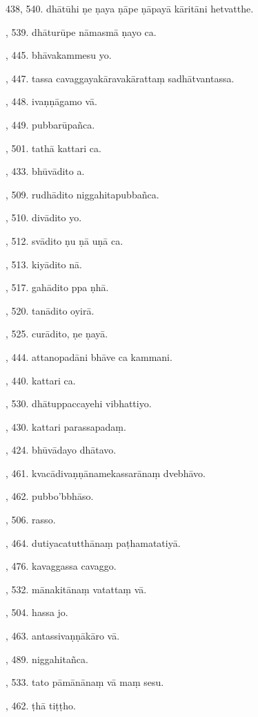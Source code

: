 438, 540. dhātūhi ṇe ṇaya ṇāpe ṇāpayā kāritāni hetvatthe.\par {}, 539. dhāturūpe nāmasmā ṇayo ca.\par {}, 445. bhāvakammesu yo.\par {}, 447. tassa cavaggayakāravakārattaṃ sadhātvantassa.\par {}, 448. ivaṇṇāgamo vā.\par {}, 449. pubbarūpañca.\par {}, 501. tathā kattari ca.\par {}, 433. bhūvādito a.\par {}, 509. rudhādito niggahitapubbañca.\par {}, 510. divādito yo.\par {}, 512. svādito ṇu ṇā uṇā ca.\par {}, 513. kiyādito nā.\par {}, 517. gahādito ppa ṇhā.\par {}, 520. tanādito oyirā.\par {}, 525. curādito, ṇe ṇayā.\par {}, 444. attanopadāni bhāve ca kammani.\par {}, 440. kattari ca.\par {}, 530. dhātuppaccayehi vibhattiyo.\par {}, 430. kattari parassapadaṃ.\par {}, 424. bhūvādayo dhātavo.\par {}, 461. kvacādivaṇṇānamekassarānaṃ dvebhāvo.\par {}, 462. pubbo’bbhāso.\par {}, 506. rasso.\par {}, 464. dutiyacatutthānaṃ paṭhamatatiyā.\par {}, 476. kavaggassa cavaggo.\par {}, 532. mānakitānaṃ vatattaṃ vā.\par {}, 504. hassa jo.\par {}, 463. antassivaṇṇākāro vā.\par {}, 489. niggahitañca.\par {}, 533. tato pāmānānaṃ vā maṃ sesu.\par {}, 462. ṭhā tiṭṭho.\par \noindent
